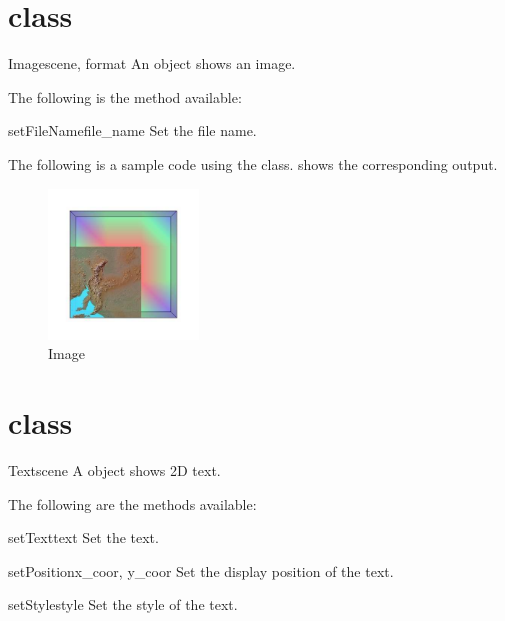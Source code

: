 \section{\Image class}
\begin{classdesc}{Image}{scene, format}
An \Image object shows an image.
\end{classdesc}

The following is the method available:
\begin{methoddesc}[Image]{setFileName}{file_name}
Set the file name.
\end{methoddesc}

The following is a sample code using the \Image class.
 shows the corresponding output.


\begin{figure}[ht]
\begin{center}
\includegraphics[width=40mm]{figures/Image}
\end{center}
\caption{Image}
\label{fig:image.1}
\end{figure}

\section{\Text class}
\begin{classdesc}{Text}{scene}
A \Text object shows 2D text. 
\end{classdesc}

The following are the methods available:
\begin{methoddesc}[Text]{setText}{text}
Set the text.
\end{methoddesc}

\begin{methoddesc}[Text]{setPosition}{x_coor, y_coor}
Set the display position of the text.
\end{methoddesc}

\begin{methoddesc}[Text]{setStyle}{style}
Set the style of the text.
\end{methoddesc}

